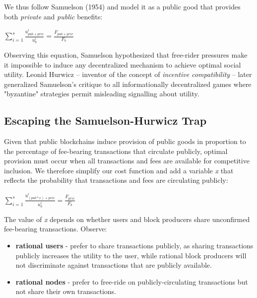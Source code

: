 \documentclass[oneside]{article}   	%
\begin{document}
We thus follow Samuelson (1954) and model it as a public good that provides both \textit{private} and \textit{public} benefits:

\LARGE
\begin{adjustwidth}{1.5em}{1.5em} 
\begin{math}
\sum_{i=1}^{s} \frac{u_{{pub}+{priv}}^i}{u_b^i} = \frac{F_{{pub}+{priv}}}{F_b}
\end{math}
\end{adjustwidth}
\normalsize

Observing this equation, Samuelson hypothesized that free-rider pressures make it impossible to induce any decentralized mechanism to achieve optimal social utility. Leonid Hurwicz -- inventor of the concept of \textit{incentive compatibility} -- later generalized Samuelson's critique to all informationally decentralized games where "byzantine" strategies permit misleading signalling about utility.

\subsection*{Escaping the Samuelson-Hurwicz Trap}

Given that public blockchains induce provision of public goods in proportion to the percentage of fee-bearing transactions that circulate publicly, optimal provision must occur when all transactions and fees are available for competitive inclusion. We therefore simplify our cost function and add a variable \textit{x} that reflects the probability that transactions and fees are circulating publicly:

\LARGE
\begin{adjustwidth}{1.5em}{1.5em} 
\begin{math}
\sum_{i=1}^{s} \frac{u_{({pub}*{x})+{priv}}^i}{u_b^i} = \frac{F_{{priv}}}{F_b}
\end{math}
\end{adjustwidth}
\normalsize

The value of \textit{x} depends on whether users and block producers share unconfirmed fee-bearing transactions. Observe:

\begin{itemize}
  \item \textbf{rational users} - prefer to share transactions publicly, as sharing transactions publicly increases the utility to the user, while  rational block producers will not discriminate against transactions that are publicly available.
  \item \textbf{rational nodes} - prefer to free-ride on publicly-circulating transactions but not share their own transactions.
\end{itemize}
\end{document}
